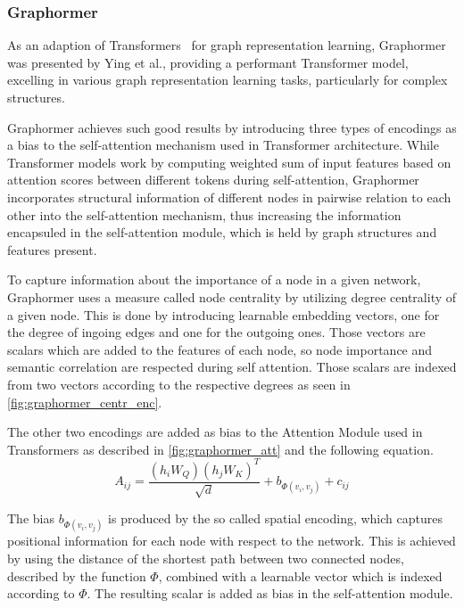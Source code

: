 \subsubsection{Graphormer}
As an adaption of Transformers~\cite{vaswani2017attention} for graph representation learning, Graphormer~\cite{2021graphormer} was presented by Ying et al., providing a performant Transformer model, excelling in various graph representation learning tasks, particularly for complex structures.

Graphormer achieves such good results by introducing three types of encodings as a bias to the self-attention mechanism used in Transformer architecture. While Transformer models work by computing weighted sum of input features based on attention scores between different tokens during self-attention, Graphormer incorporates structural information of different nodes in pairwise relation to each other into the self-attention mechanism, thus increasing the information encapsuled in the self-attention module, which is held by graph structures and features present.

To capture information about the importance of a node in a given network, Graphormer uses a measure called node centrality by utilizing degree centrality of a given node. This is done by introducing learnable embedding vectors, one for the degree of ingoing edges and one for the outgoing ones. Those vectors are scalars which are added to the features of each node, so node importance and semantic correlation are respected during self attention. Those scalars are indexed from two vectors according to the respective degrees as seen in \autoref{fig:graphormer_centr_enc}.

The other two encodings are added as bias to the Attention Module used in Transformers as described in \autoref{fig:graphormer_att} and the following equation.
\begin{equation}
    A_{ij} = \frac{(h_i W_Q)(h_j W_K)^T}{\sqrt{d}} + b_{\Phi (v_i, v_j)} + c_{ij}
    \label{eqn:attention-matrix}
\end{equation}

The bias $b_{\Phi (v_i, v_j)}$ is produced by the so called spatial encoding, which captures positional information for each node with respect to the network. This is achieved by using the distance of the shortest path between two connected nodes, described by the function $\Phi$, combined with a learnable vector which is indexed according to $\Phi$. The resulting scalar is added as bias in the self-attention module. 

